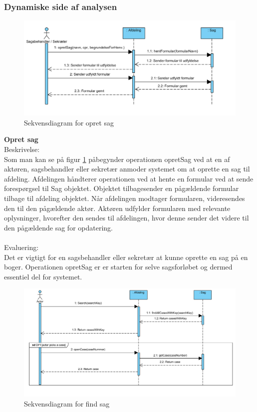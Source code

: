 \subsubsection{Dynamiske side af analysen}
\begin{figure}[htb!]
  \includegraphics[width=\linewidth]{./PNG/analyse/opretSag.PNG} 
  \caption{Sekvensdiagram for opret sag}
  \label{fig:opretSag}
\end{figure}
\textbf{Opret sag}\\
Beskrivelse:\\
Som man kan se på figur \ref{fig:opretSag} påbegynder operationen opretSag ved at en af aktøren, sagsbehandler eller sekretær anmoder systemet om at oprette en sag til afdeling. Afdelingen håndterer operationen ved at hente en formular ved at sende forespørgsel til Sag objektet. Objektet tilbagesender en pågældende formular tilbage til afdeling objektet. Når afdelingen modtager formularen, videresendes den til den pågældende aktør. Aktøren udfylder formularen med relevante oplysninger, hvorefter den sendes til afdelingen, hvor denne sender det videre til den pågældende sag for opdatering. \\ \\
Evaluering:\\
Det er vigtigt for en sagsbehandler eller sekretær at kunne oprette en sag på en boger. Operationen opretSag er er starten for selve sagsforløbet og dermed essentiel del for systemet. \\
\begin{figure}[htb!]
  \includegraphics[width=\linewidth]{./PNG/analyse/findSag.PNG} 
  \caption{Sekvensdiagram for find sag}
  \label{fig:findSag}
\end{figure}\\
